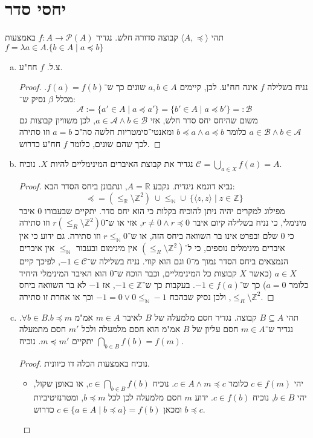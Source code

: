\documentclass[]{article}
\newcommand\N     {\mathbb{N}}
\newcommand\Z     {\mathbb{Z}}
\newcommand\R     {\mathbb{R}}
\newcommand\ps    {\mathcal{P}}
\newcommand\ac    {\mathcal{A}}
\newcommand\bc    {\mathcal{B}}
\newcommand\cc    {\mathcal{C}}
\newcommand\ra    {\rangle}
\newcommand\la    {\langle}
\begin{document}
	\section{יחסי סדר}
	תהי $\la A, \preceq \ra$ קבוצה סדורה חלש. נגדיר $f \colon A \to \ps(A)$ באמצעות $f = \lambda a \in A. \{b \in A \mid a \preceq b\}$
	\begin{enumerate}[(a)]
		\item צ.ל. $f$ חח"ע. \begin{proof}
			נניח בשלילה $f$ אינה חח"ע. לכן, קיימים $a, b \in A$ שונים כך ש־$f(a) = f(b)$. מכלל $\beta$ נסיק ש־:
			\[ \ac := \{a' \in A \mid a \preceq a'\} = \{b' \in A \mid a \preceq b'\} =: \bc \]
			משום שהיחס יחס סדר חלש, אזי $a \in \ac \land b \in \bc$, לכן משוויון קבוצות גם $a \in \bc \land b \in \ac$ כלומר $b \preceq a \land a \preceq b$ ומאנטי־סימטריות חלשה סה"כ $a = b$ וזו סתירה לכך שהם שונים, כלומר $f$ חח"ע כדרוש. 
		\end{proof}
		\item נגדיר את קבוצת האיברים המינימליים להיות $X$. נוכיח $\cc = \bigcup_{a \in X} f(a) = A$. 
		\begin{proof}
			נביא דוגמא ניגדית. נקבע $A = \R$, ונתבונן ביחס הסדר הבא: 
			\[ \preceq = (\le_\R \setminus \Z^2) \ \cup \le_\N \cup \ \{ \la z, z \ra \mid z \in \Z\} \]
			מפילוג למקרים יהיה ניתן להוכיח בקלות כי הוא יחס סדר. יתקיים שבעבורו $0$ איבר מינימלי, כי נניח בשלילה קיום איבר $r \neq 0 \land r \preceq 0$, אזי או ש־$r (\le_R \setminus \Z^2) 0$ וזו סתירה כי $0$ שלם ובפרט אינו בר השוואה ביחס הזה, או ש־$r \le_\N 0$ וזו סתירה. גם ידוע כי אין איברים מינימלים נוספים, כי ל־$(\le_R \setminus \Z^2)$ אין מינימום ובעבור $\le_\N$ אין איברים הנמצאים ביחס הסדר נמוך מ־0 וגם הוא קווי. נניח בשלילה ש־$-1 \in \cc$, לפיכך קיים $a \in X$ (כאשר $X$ קבוצות כל המינימליים, וכבר הוכח ש־$0$ הוא האיבר המינימלי היחיד כלומר $a = 0$) כך ש־$-1 \in f(a)$. בעקבות כך ש־$-1 \in \Z$, אז $-1$ לא בר השוואה ביחס $\le_R \setminus \Z^2$, ולכן נסיק שבהכח $-1 = 0 \lor 0 \le_\N -1 $ וכך או אחרת זו סתירה. 
		\end{proof}
		\item תהי $B \subseteq A$ קבוצה. נגדיר חסם מלמעלה של $B$ לאיבר $m \in A$ אמ"מ $\forall b \in B. b \preceq m$. נגדיר ש־$m \in A$ חסם עליון של $B$ אמ"מ הוא חסם מלמעלה ולכל $m'$ חסם מתמעלה יתקיים $m \preceq m'$. נוכיח $\bigcap_{b \in B} f(b) =  f(m)$. \begin{proof}
			נוכיח באמצעות הכלה דו כיוונית. 
			\begin{itemize}
				\item יהי $c \in f(m)$ כלומר $c \in A \land m \preceq c$. נוכיח $c \in \bigcap_{b \in B} f(b)$, או באופן שקול, יהי $b \in B$, נוכיח $c \in f(b)$. ידוע $m$ חסם מלמעלה לכן לכל $b \preceq m$, ומטרנזיטיביות $b \preceq c$ ומכאן $c \in \{a \in A \mid b \preceq a\} = f(b)$ כדרוש. 

\end{itemize}
\end{proof}
\end{enumerate}
\end{document}
